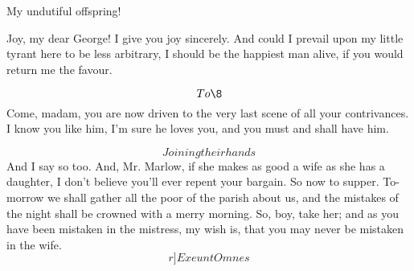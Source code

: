 \documentclass{book}
\begin{document}
\7  My undutiful offspring!

\2  Joy, my dear George!  I give you joy sincerely.  And could I
prevail upon my little tyrant here to be less arbitrary, I should be
the happiest man alive, if you would return me the favour.

\4  \[To \8\]  Come, madam, you are now driven to
the very last scene of all your contrivances.  I know you like him, I'm
sure he loves you, and you must and shall have him.

\3  \[Joining their hands\]  And I say so too.  And, Mr.
Marlow, if she makes as good a wife as she has a daughter, I don't
believe you'll ever repent your bargain.  So now to supper.  To-morrow
we shall gather all the poor of the parish about us, and the mistakes
of the night shall be crowned with a merry morning.  So, boy, take her;
and as you have been mistaken in the mistress, my wish is, that you may
never be mistaken in the wife.  \[r]Exeunt Omnes\]

\Facies {}
%

\endProsa
\endDrama
\end{document}
